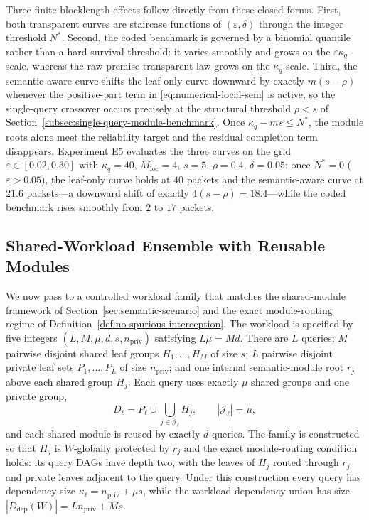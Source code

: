 \documentclass[journal]{IEEEtran}
\numberwithin{equation}{section}
\begin{document}
Three finite-blocklength effects follow directly from these closed
forms.  First, both
transparent curves are staircase functions of \((\varepsilon,\delta)\) through
the integer threshold \(N^{*}\).  Second, the coded benchmark is governed by a
binomial quantile rather than a hard survival threshold: it varies smoothly
and grows on the \(\varepsilon\kappa_q\)-scale, whereas the raw-premise
transparent law grows on the \(\kappa_q\)-scale.  Third, the semantic-aware
curve shifts the leaf-only curve downward by exactly \(m(s-\rho)\) whenever
the positive-part term in \eqref{eq:numerical-local-sem} is active, so the
single-query crossover occurs precisely at the structural threshold
\(\rho<s\) of Section~\ref{subsec:single-query-module-benchmark}.  Once
\(\kappa_q-ms\le N^{*}\), the module roots alone meet the reliability
target and the residual completion term disappears.
Experiment E5 evaluates the three curves on the grid
\(\varepsilon\in[0.02,0.30]\) with \(\kappa_q=40\), \(M_{\mathrm{loc}}=4\),
\(s=5\), \(\rho=0.4\), \(\delta=0.05\): once \(N^{*}=0\)
(\(\varepsilon>0.05\)), the leaf-only curve holds at \(40\) packets and the
semantic-aware curve at \(21.6\) packets---a downward shift of exactly
\(4(s-\rho)=18.4\)---while the coded benchmark rises smoothly from \(2\)
to \(17\) packets.

\subsection{Shared-Workload Ensemble with Reusable Modules}
\label{subsec:numerical-workload-family}

We now pass to a controlled workload family that matches the shared-module
framework of Section~\ref{sec:semantic-scenario} and the exact module-routing
regime of Definition~\ref{def:no-spurious-interception}.  The workload is
specified by five integers \((L,M,\mu,d,s,n_{\mathrm{priv}})\) satisfying
\(L\mu=Md\).  There are \(L\) queries; \(M\) pairwise disjoint shared leaf
groups \(H_1,\ldots,H_M\) of size \(s\); \(L\) pairwise disjoint private leaf
sets \(P_1,\ldots,P_L\) of size \(n_{\mathrm{priv}}\); and one internal
semantic-module root \(r_j\) above each shared group \(H_j\).  Each query
uses exactly \(\mu\) shared groups and one private group,
\begin{equation}
  D_\ell
  =
  P_\ell
  \cup
  \bigcup_{j\in\mathcal J_\ell}H_j,
  \qquad
  |\mathcal J_\ell|=\mu,
\label{eq:numerical-query-incidence}
\end{equation}
and each shared module is reused by exactly \(d\) queries.  The family is
constructed so that \(H_j\) is \(W\)-globally protected by \(r_j\) and the
exact module-routing condition holds: its query DAGs have depth two, with the
leaves of \(H_j\) routed through \(r_j\) and private leaves adjacent to the
query.  Under this construction every query has dependency size
\(\kappa_\ell=n_{\mathrm{priv}}+\mu s\), while the workload dependency union
has size
\(|D_{\mathrm{dep}}(W)|=Ln_{\mathrm{priv}}+Ms\).
\end{document}
